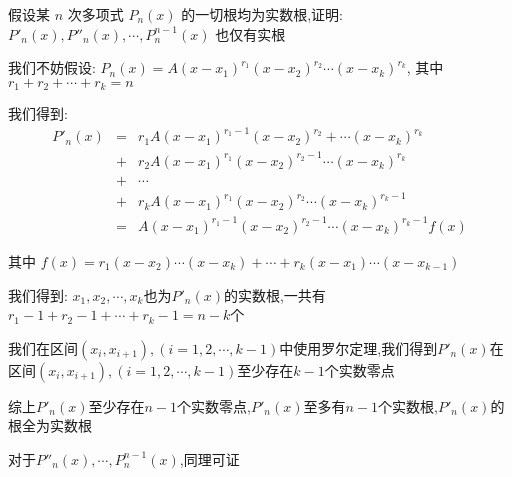 \begin{proposition}
	假设某 $n$ 次多项式 $P_{n}(x)$ 的一切根均为实数根,证明: $P'_{n}(x),P''_{n}(x),\cdots,P_{n}^{n-1}(x)$ 也仅有实根
\end{proposition}
\begin{solution}

	我们不妨假设:  $P_{n}(x)=A(x-x_{1})^{r_{1}}(x-x_{2})^{r_{2}}\cdots(x-x_{k})^{r_{k}}$, 其中 $r_{1}+r_{2}+\cdots+r_{k}=n$

	我们得到:
	\begin{eqnarray*}
		P'_{n}(x)&=&r_{1}A(x-x_{1})^{r_{1}-1}(x-x_{2})^{r_{2}}+\cdots(x-x_{k})^{r_{k}}\\
		&+&r_{2}A(x-x_{1})^{r_{1}}(x-x_{2})^{r_{2}-1}\cdots(x-x_{k})^{r_{k}}\\
		&+&\cdots\\
		&+&r_{k}A(x-x_{1})^{r_{1}}(x-x_{2})^{r_{2}}\cdots(x-x_{k})^{r_{k}-1}\\
		&=&A(x-x_{1})^{r_{1}-1}(x-x_{2})^{r_{2}-1}\cdots(x-x_{k})^{r_{k}-1}f(x)
	\end{eqnarray*}

	其中 $f(x)=r_{1}(x-x_{2})\cdots(x-x_{k})+\cdots+r_{k}(x-x_{1})\cdots(x-x_{k-1})$

	我们得到:  $x_{1},x_{2},\cdots,x_{k}$也为$P'_{n}(x)$的实数根,一共有$r_{1}-1+r_{2}-1+\cdots+r_{k}-1=n-k$个

	我们在区间$(x_{i},x_{i+1}),(i=1,2,\cdots,k-1)$中使用罗尔定理,我们得到$P'_{n}(x)$在区间$(x_{i},x_{i+1}),(i=1,2,\cdots,k-1)$至少存在$k-1$个实数零点

	综上$P'_{n}(x)$至少存在$n-1$个实数零点,$P'_{n}(x)$至多有$n-1$个实数根,$P'_{n}(x)$的根全为实数根

	对于$P''_{n}(x),\cdots,P_{n}^{n-1}(x)$,同理可证

\end{solution}


